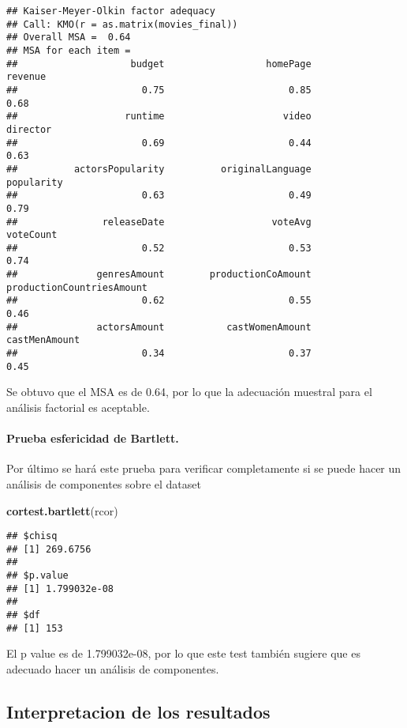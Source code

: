 \documentclass[
]{article}
\newenvironment{Shaded}{\begin{snugshade}}{\end{snugshade}}
\newcommand{\FunctionTok}[1]{\textcolor[rgb]{0.13,0.29,0.53}{\textbf{#1}}}
\newcommand{\NormalTok}[1]{#1}
\begin{document}
\begin{verbatim}
## Kaiser-Meyer-Olkin factor adequacy
## Call: KMO(r = as.matrix(movies_final))
## Overall MSA =  0.64
## MSA for each item = 
##                    budget                  homePage                   revenue 
##                      0.75                      0.85                      0.68 
##                   runtime                     video                  director 
##                      0.69                      0.44                      0.63 
##          actorsPopularity          originalLanguage                popularity 
##                      0.63                      0.49                      0.79 
##               releaseDate                   voteAvg                 voteCount 
##                      0.52                      0.53                      0.74 
##              genresAmount        productionCoAmount productionCountriesAmount 
##                      0.62                      0.55                      0.46 
##              actorsAmount           castWomenAmount             castMenAmount 
##                      0.34                      0.37                      0.45
\end{verbatim}

Se obtuvo que el MSA es de 0.64, por lo que la adecuación muestral para
el análisis factorial es aceptable.

\paragraph{Prueba esfericidad de
Bartlett.}\label{prueba-esfericidad-de-bartlett.}

Por último se hará este prueba para verificar completamente si se puede
hacer un análisis de componentes sobre el dataset

\begin{Shaded}
\begin{Highlighting}[]
\FunctionTok{cortest.bartlett}\NormalTok{(rcor)}
\end{Highlighting}
\end{Shaded}

\begin{verbatim}
## $chisq
## [1] 269.6756
## 
## $p.value
## [1] 1.799032e-08
## 
## $df
## [1] 153
\end{verbatim}

El p value es de 1.799032e-08, por lo que este test también sugiere que
es adecuado hacer un análisis de componentes.

\subsection{Interpretacion de los
resultados}\label{interpretacion-de-los-resultados}
\end{document}
